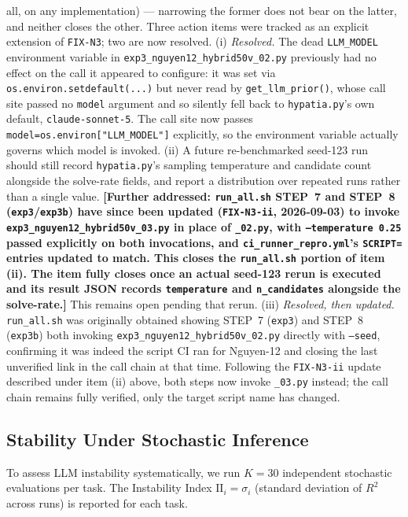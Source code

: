 \documentclass[twoside,11pt]{article}
\newcommand{\Rsq}{R^{2}}
\newcommand{\II}{\mathrm{II}}
\begin{document}
all, on any implementation) --- narrowing the former does not bear on the
latter, and neither closes the other. Three action items were tracked as an explicit extension of
\texttt{FIX-N3}; two are now resolved. (i) \emph{Resolved.} The dead
\texttt{LLM\_MODEL} environment variable in
\texttt{exp3\_nguyen12\_hybrid50v\_02.py} previously had no effect on
the call it appeared to configure: it was set via
\texttt{os.environ.setdefault(...)} but never read by
\texttt{get\_llm\_prior()}, whose call site passed no \texttt{model}
argument and so silently fell back to \texttt{hypatia.py}'s own default,
\texttt{claude-sonnet-5}. The call site now passes
\texttt{model=os.environ["LLM\_MODEL"]} explicitly, so the environment
variable actually governs which model is invoked. (ii) A future re-benchmarked seed-123 run should still record
\texttt{hypatia.py}'s sampling temperature and candidate count alongside
the solve-rate fields, and report a distribution over repeated runs rather
than a single value.  \textbf{[Further addressed: \texttt{run\_all.sh}
STEP~7 and STEP~8 (\texttt{exp3}/\texttt{exp3b}) have since been updated
(\texttt{FIX-N3-ii}, 2026-09-03) to invoke
\texttt{exp3\_nguyen12\_hybrid50v\_03.py} in place of \texttt{\_02.py}, with
\texttt{--temperature 0.25} passed explicitly on both invocations, and
\texttt{ci\_runner\_repro.yml}'s \texttt{SCRIPT=} entries updated to match.
This closes the \texttt{run\_all.sh} portion of item (ii). The item fully
closes once an actual seed-123 rerun is executed and its result JSON
records \texttt{temperature} and \texttt{n\_candidates} alongside the
solve-rate.]}
This remains open pending that rerun. (iii) \emph{Resolved, then updated.}
\texttt{run\_all.sh} was originally obtained showing STEP~7 (\texttt{exp3})
and STEP~8 (\texttt{exp3b}) both invoking
\texttt{exp3\_nguyen12\_hybrid50v\_02.py} directly with \texttt{--seed},
confirming it was indeed the script CI ran for Nguyen-12 and closing the
last unverified link in the call chain at that time. Following the
\texttt{FIX-N3-ii} update described under item (ii) above, both steps now
invoke \texttt{\_03.py} instead; the call chain remains fully verified,
only the target script name has changed.

\subsection{Stability Under Stochastic Inference}\label{subsec:stability-under-stochastic-inference}
\label{sec:instability_results}

To assess LLM instability systematically, we run $K=30$ independent stochastic
evaluations per task.  The Instability Index $\II_i = \sigma_i$ (standard deviation
of $\Rsq$ across runs) is reported for each task.
\end{document}

